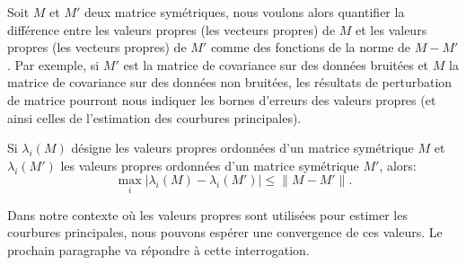 Soit $M$ et $M'$ deux matrice symétriques, nous voulons alors quantifier la
différence entre les valeurs propres (\respp les vecteurs propres) de $M$ et les
valeurs propres (\resp les vecteurs propres) de $M'$ comme des fonctions de la
norme de $M - M'$. Par exemple, si $M'$ est la matrice de covariance sur des
données bruitées et $M$ la matrice de covariance sur des données non bruitées,
les résultats de perturbation de matrice pourront nous indiquer les bornes
d'erreurs des valeurs propres (et ainsi celles de l'estimation des courbures
principales).
%
\begin{theorem}{}
  \label{thm:lidskii-weyl}
  Si $\lambda_i(M)$ désigne les valeurs propres ordonnées d'un matrice
  symétrique $M$ et $\lambda_i(M')$ les valeurs propres ordonnées d'un matrice
  symétrique $M'$, alors:
  \begin{equation}
    \max_{i}| \lambda_i(M) - \lambda_i(M')| \le \|M-M'\| .
  \end{equation}
\end{theorem}
%
Dans notre contexte où les valeurs propres sont utilisées pour estimer les
courbures principales, nous pouvons espérer une convergence de ces valeurs. Le
prochain paragraphe va répondre à cette interrogation.
%
